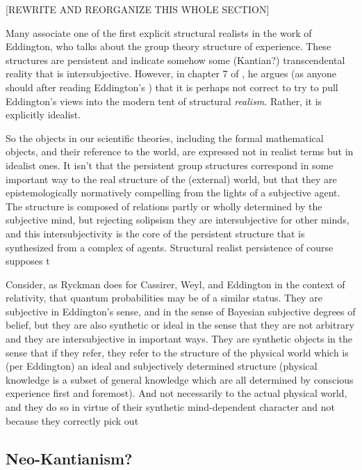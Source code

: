 [REWRITE AND REORGANIZE THIS WHOLE SECTION]


Many associate one of the first explicit structural realists in the work of Eddington, who talks about the group theory structure of experience.  These structures are persistent and indicate somehow some  (Kantian?) transcendental reality that is intersubjective.  However, in chapter 7 of \cite{Ryckman2005}, he argues (as anyone should after reading Eddington's \cite{Eddington1939}) that it is perhaps not correct to try to pull Eddington's views into the modern tent of structural \emph{realism}.  Rather, it is explicitly idealist.  

So the objects in our scientific theories, including the formal mathematical objects, and their reference to the world, are expressed not in realist terms but in idealist ones.  It isn't that the persistent group structures correspond in some important way to the real structure of the (external) world, but that they are epistemologically normatively compelling from the lights of a subjective agent.  The structure is composed of relations partly or wholly determined by the subjective mind, but rejecting solipsism they are intersubjective for other minds, and this intersubjectivity is the core of the persistent structure that is synthesized from a complex of agents.  Structural realist persistence of course supposes t



Consider, as Ryckman does for Cassirer, Weyl, and Eddington in the context of relativity, that quantum probabilities may be of a similar status.  They are subjective in Eddington's sense, and in the sense of Bayesian subjective degrees of belief, but they are also synthetic or ideal in the sense that they are not arbitrary and they are intersubjective in important ways.  They are synthetic objects in the sense that if they refer, they refer to the structure of the physical world which is (per Eddington) an ideal and subjectively determined structure (physical knowledge is a subset of general knowledge which are all determined by conscious experience first and foremost).  And not necessarily to the actual physical world, and they do so in virtue of their synthetic mind-dependent character and not because they correctly pick out 





\subsection{Neo-Kantianism?}

